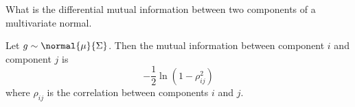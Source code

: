 
What is the differential mutual information
between two components of a multivariate normal.


\begin{prop}
Let $g \sim \normal{\mu}{\Sigma}$.
Then the mutual information between
component $i$ and component $j$ is
\[
  -\frac{1}{2}\ln(1 - \rho_{ij}^2)
\]
where $\rho_{ij}$ is the correlation
between components $i$ and $j$.
\end{prop}
\strats
